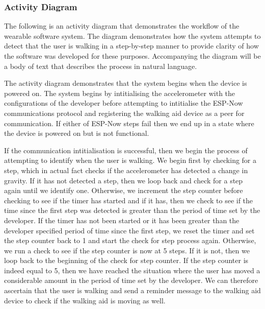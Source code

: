                \newpage

            \subsubsection{Activity Diagram}
            \label{subsubsec:wearable_activity}

                The following is an activity diagram that demonstrates the workflow of the wearable software system. The diagram demonstrates how the system attempts to detect that the user is walking in a step-by-step manner to provide clarity of how the software was developed for these purposes. Accompanying the diagram will be a body of text that describes the process in natural language.

                

                The activity diagram demonstrates that the system begins when the device is powered on. The system begins by intitialising the accelerometer with the configurations of the developer before attempting to intitialise the ESP-Now communications protocol and registering the walking aid device as a peer for communication. If either of ESP-Now steps fail then we end up in a state where the device is powered on but is not functional. 

                If the communication intitialisation is successful, then we begin the process of attempting to identify when the user is walking. We begin first by checking for a step, which in actual fact checks if the accelerometer has detected a change in gravity. If it has not detected a step, then we loop back and check for a step again until we identify one. Otherwise, we increment the step counter before checking to see if the timer has started and if it has, then we check to see if the time since the first step was detected is greater than the period of time set by the developer. If the timer has not been started or it has been greater than the developer specified period of time since the first step, we reset the timer and set the step counter back to 1 and start the check for step process again. Otherwise, we run a check to see if the step counter is now at 5 steps. If it is not, then we loop back to the beginning of the check for step counter. If the step counter is indeed equal to 5, then we have reached the situation where the user has moved a considerable amount in the period of time set by the developer. We can therefore ascertain that the user is walking and send a reminder message to the walking aid device to check if the walking aid is moving as well.

